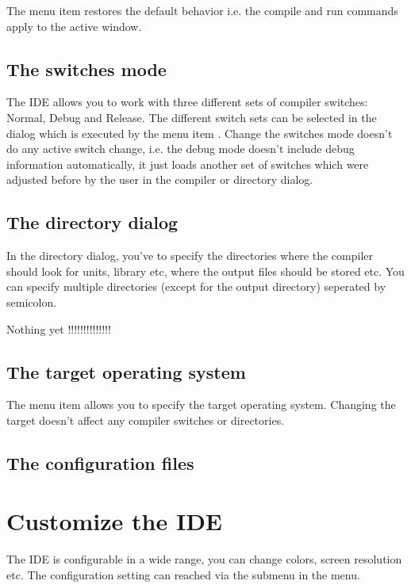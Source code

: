 The menu item  restores the default behavior
i.e. the compile and run commands apply to the active window.

\subsection{The switches mode}
\label{se:compilermode}
The IDE allows you to work with three different sets of compiler
switches: Normal, Debug and Release. The different switch
sets can be selected in the  dialog which
is executed by the menu item .
Change the switches mode doesn't do any active switch change, i.e.
the debug mode doesn't include debug information automatically,
it just loads another set of switches which were adjusted before
by the user in the compiler or directory dialog.

\subsection{The directory dialog}
In the directory dialog, you've to specify the directories where
the compiler should look for units, library etc, where the
output files should be stored etc. You can specify multiple
directories (except for the output directory) seperated by
semicolon.

\begin{description}
\item Nothing yet !!!!!!!!!!!!!!
\end{description}

\subsection{The target operating system}
The menu item  allows you to specify the target
operating system. Changing the target doesn't affect any compiler
switches or directories.

\subsection{The configuration files}

\section{Customize the IDE}
The IDE is configurable in a wide range, you can change colors, screen
resolution etc. The configuration setting can reached via the
submenu  in the  menu.

